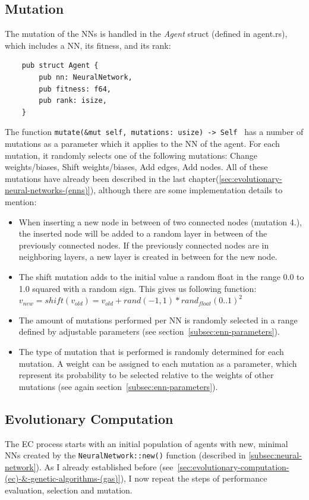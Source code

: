 \documentclass[11pt]{report}
\begin{document}
\begin{enumerate}
    \subsection{Mutation}\label{subsec:mutation}
    The mutation of the NNs is handled in the \textit{Agent} struct (defined in agent.rs), which includes a NN, its fitness, and its rank:
    \begin{verbatim}
    pub struct Agent {
        pub nn: NeuralNetwork,
        pub fitness: f64,
        pub rank: isize,
    }
    \end{verbatim}
    The function \texttt{mutate(&mut self, mutations: usize) -> Self {} } has a number of mutations as a parameter which it applies to the NN of the agent.
    For each mutation, it randomly selects one of the following mutations: Change weights/biases, Shift weights/biases, Add edges, Add nodes.
    All of these mutations have already been described in the last chapter(\ref{sec:evolutionary-neural-networks-(enns)}), although there are some implementation details to mention:
    \begin{itemize}
        \item When inserting a new node in between of two connected nodes (mutation 4.), the inserted node will be added to a random layer in between of the previously connected nodes.
        If the previously connected nodes are in neighboring layers, a new layer is created in between for the new node.
        \item The shift mutation adds to the initial value a random float in the range 0.0 to 1.0 squared with a random sign.
        This gives us following function: \\
        $v_{new} = shift(v_{old}) = v_{old} + rand(-1, 1) * rand_{float}(0..1)^2$
        \item The amount of mutations performed per NN is randomly selected in a range defined by adjustable parameters (see section~\ref{subsec:enn-parameters}).
        \item The type of mutation that is performed is randomly determined for each mutation.
        A weight can be assigned to each mutation as a parameter, which represent its probability to be selected relative to the weights of other mutations (see again section~\ref{subsec:enn-parameters}).
    \end{itemize}

    \subsection{Evolutionary Computation}\label{subsec:natural-slection}
    The EC process starts with an initial population of agents with new, minimal NNs created by the \texttt{NeuralNetwork::new()} function (described in \ref{subsec:neural-network}).
    As I already established before (see~\ref{sec:evolutionary-computation-(ec)-&-genetic-algorithms-(gas)}), I now repeat the steps of performance evaluation, selection and mutation.


\end{enumerate}
\end{document}
